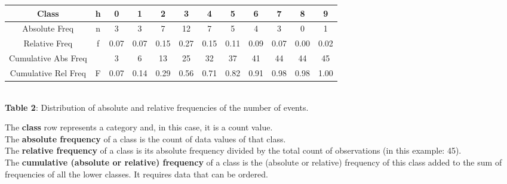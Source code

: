 \begin{frame}
  \begin{table}
    \centering
    \begin{tiny}
      \begin{tabular}{|*{12}{c|}}
        \hline
        \textbf{Class} & \textbf{h} & \textbf{0} & \textbf{1} & \textbf{2} & \textbf{3} & \textbf{4} & \textbf{5} & \textbf{6} & \textbf{7} & \textbf{8} & \textbf{9}  \\
        \hline
        Absolute Freq & n & 3 & 3 & 7 & 12 & 7 & 5 & 4 & 3 & 0 & 1  \\
        \hline
        Relative Freq & f & 0.07 & 0.07 & 0.15 & 0.27 & 0.15 & 0.11 & 0.09 & 0.07 & 0.00 & 0.02 \\
        \hline
        Cumulative Abs Freq &  & 3 & 6 & 13 & 25 & 32 & 37 & 41 & 44 & 44 & 45  \\
        \hline
        Cumulative Rel Freq & F & 0.07 & 0.14 & 0.29 & 0.56 & 0.71 & 0.82 & 0.91 & 0.98 & 0.98 & 1.00  \\
        \hline
      \end{tabular}\\
      \vspace*{.2cm}
      \textbf{Table 2}: Distribution of absolute and relative frequencies of the number of events.\\
    \end{tiny}
  \end{table}
  \begin{footnotesize}
    \vspace*{-.2cm}
    The \textbf{class} row represents a category and, in this case, it is a count value. \\
    \vspace*{.2cm}
    The \textbf{absolute frequency} of a class is the count of data values of that class.\\
    \vspace*{.2cm}
    The \textbf{relative frequency} of a class is its absolute frequency divided by the total count of observations (in this example: 45).\\
    \vspace*{.2cm}
    The \textbf{cumulative (absolute or relative) frequency} of a class is the (absolute or relative) frequency of this class added to the sum of frequencies of all the lower classes. It requires data that can be ordered.
  \end{footnotesize}
\end{frame}

